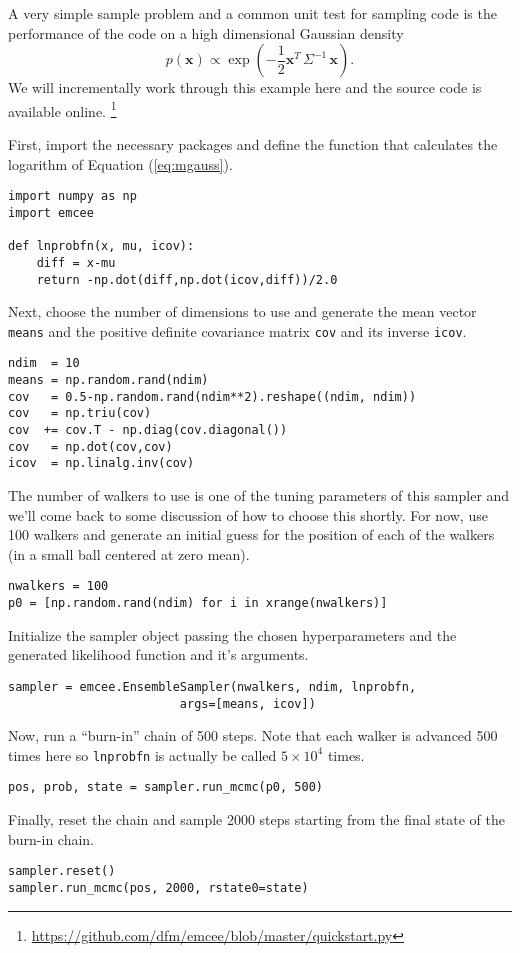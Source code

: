 \documentclass[12pt,preprint]{aastex}
\newcommand{\code}[1]{\texttt{#1}}
\newcommand{\eq}[1]{Equation (\ref{eq:#1})}
\newcommand{\eqlabel}[1]{\label{eq:#1}}
\newcommand{\pr}[1]{\ensuremath{p(#1)}}
\begin{document}
A very simple sample problem and a common unit test for sampling code is
the performance of the code on a high dimensional Gaussian density
\begin{equation}\eqlabel{mgauss}
    \pr{\mathbf{x}} \propto \exp\left ( -\frac{1}{2} \mathbf{x}^T \,
                                \Sigma^{-1} \, \mathbf{x} \right ).
\end{equation}
We will incrementally work through this example here and the source code
is available online.%
\footnote{\url{https://github.com/dfm/emcee/blob/master/quickstart.py}}

First, import the necessary packages and define the function that calculates
the logarithm of \eq{mgauss}.
\begin{lstlisting}
import numpy as np
import emcee

def lnprobfn(x, mu, icov):
    diff = x-mu
    return -np.dot(diff,np.dot(icov,diff))/2.0
\end{lstlisting}
Next, choose the number of dimensions to use and generate the mean vector
\code{means} and the positive definite covariance matrix \code{cov} and its
inverse \code{icov}.
\begin{lstlisting}
ndim  = 10
means = np.random.rand(ndim)
cov   = 0.5-np.random.rand(ndim**2).reshape((ndim, ndim))
cov   = np.triu(cov)
cov  += cov.T - np.diag(cov.diagonal())
cov   = np.dot(cov,cov)
icov  = np.linalg.inv(cov)
\end{lstlisting}
The number of walkers to use is one of the tuning parameters of this sampler
and we'll come back to some discussion of how to choose this shortly. For
now, use 100 walkers and generate an initial guess for the position of each
of the walkers (in a small ball centered at zero mean).
\begin{lstlisting}
nwalkers = 100
p0 = [np.random.rand(ndim) for i in xrange(nwalkers)]
\end{lstlisting}
Initialize the sampler object passing the chosen hyperparameters and the
generated likelihood function and it's arguments.
\begin{lstlisting}
sampler = emcee.EnsembleSampler(nwalkers, ndim, lnprobfn,
                        args=[means, icov])
\end{lstlisting}
Now, run a ``burn-in'' chain of 500 steps. Note that each walker is advanced
500 times here so \code{lnprobfn} is actually be called $5\times10^4$ times.
\begin{lstlisting}
pos, prob, state = sampler.run_mcmc(p0, 500)
\end{lstlisting}
Finally, reset the chain and sample 2000 steps starting from the final state
of the burn-in chain.
\begin{lstlisting}
sampler.reset()
sampler.run_mcmc(pos, 2000, rstate0=state)
\end{lstlisting}
\end{document}
